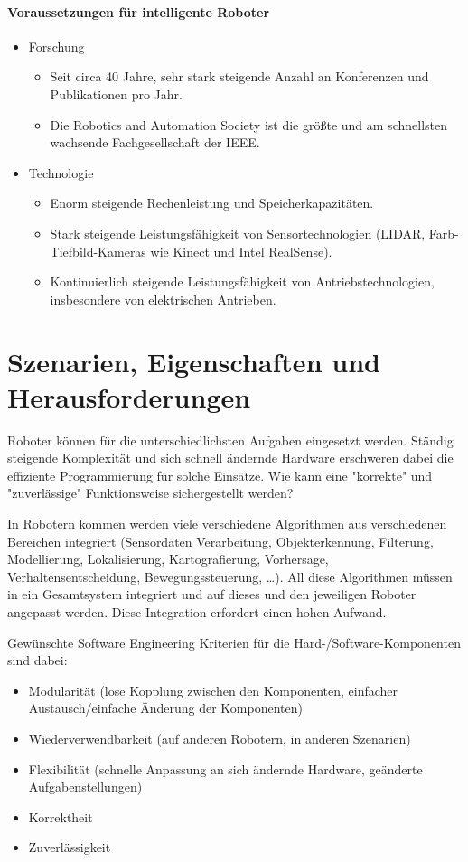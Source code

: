 	\paragraph{Voraussetzungen für intelligente Roboter}
		\begin{itemize}
			\item Forschung
				\begin{itemize}
					\item Seit circa 40 Jahre, sehr stark steigende Anzahl an Konferenzen und Publikationen pro Jahr.
					\item Die Robotics and Automation Society ist die größte und am schnellsten wachsende Fachgesellschaft der IEEE.
				\end{itemize}
			\item Technologie
				\begin{itemize}
					\item Enorm steigende Rechenleistung und Speicherkapazitäten.
					\item Stark steigende Leistungsfähigkeit von Sensortechnologien (\zB LIDAR, Farb-Tiefbild-Kameras wie Kinect und Intel RealSense).
					\item Kontinuierlich steigende Leistungsfähigkeit von Antriebstechnologien, insbesondere von elektrischen Antrieben.
				\end{itemize}
		\end{itemize}

	\section{Szenarien, Eigenschaften und Herausforderungen}
		Roboter können für die unterschiedlichsten Aufgaben eingesetzt werden. Ständig steigende Komplexität und sich schnell ändernde Hardware erschweren dabei die effiziente Programmierung für solche Einsätze. Wie kann eine "korrekte" und "zuverlässige" Funktionsweise sichergestellt werden?
		
		In Robotern kommen werden viele verschiedene Algorithmen aus verschiedenen Bereichen integriert (Sensordaten Verarbeitung, Objekterkennung, Filterung, Modellierung, Lokalisierung, Kartografierung, Vorhersage, Verhaltensentscheidung, Bewegungssteuerung, \dots). All diese Algorithmen müssen in ein Gesamtsystem integriert und auf dieses und den jeweiligen Roboter angepasst werden. Diese Integration erfordert einen hohen Aufwand.
		
		Gewünschte Software Engineering Kriterien für die Hard-/Software-Komponenten sind dabei:
		\begin{itemize}
			\item Modularität (lose Kopplung zwischen den Komponenten, einfacher Austausch/einfache Änderung der Komponenten)
			\item Wiederverwendbarkeit (auf anderen Robotern, in anderen Szenarien)
			\item Flexibilität (schnelle Anpassung an sich ändernde Hardware, geänderte Aufgabenstellungen)
			\item Korrektheit
			\item Zuverlässigkeit
		\end{itemize}

